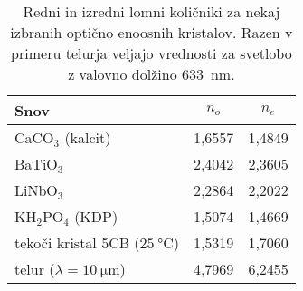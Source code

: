 \begin{table}[h]
 \centering
\begin{tabular}{|l|c|c|} \hline  
      Snov & $n_o$ & $n_e$ \\ \hline
      CaCO$_3$ (kalcit) & 1,6557 & 1,4849 \\ \hline\index{CaCO$_3$|see {Kalcit}}
      BaTiO$_3$ & 2,4042 & 2,3605 \\ \hline \index{BaTiO$_3$}
      LiNbO$_3$ & 2,2864 & 2,2022 \\ \hline \index{LiNbO$_3$}
      KH$_2$PO$_4$ (KDP) & 1,5074 & 1,4669 \\ \hline \index{KH$_2$PO$_4$|see {KDP}}\index{KDP}
      tekoči kristal 5CB ($25~\si{\degreeCelsius}$) & 1,5319 & 1,7060 \\ 
      \hline \index{Tekoči kristali} \index{Telur}
      telur ($\lambda = 10~\si{\micro\metre}$) & 4,7969 & 6,2455 \\ 
\hline 
\end{tabular}
  \caption{Redni in izredni lomni količniki za nekaj izbranih optično enoosnih kristalov. Razen v primeru telurja
   veljajo vrednosti za svetlobo z valovno dolžino 633~\si{\nano\metre}.}
\label{table:none}
\end{table}


